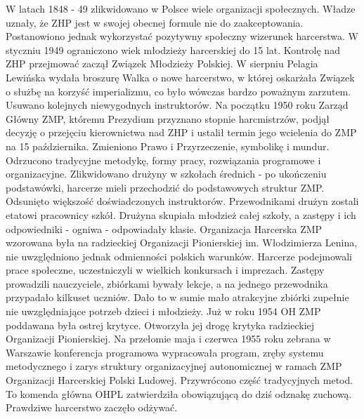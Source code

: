 W latach 1848 - 49 zlikwidowano w Polsce wiele organizacji społecznych. Władze uznały, że ZHP jest w swojej obecnej formule nie do zaakceptowania. Postanowiono jednak wykorzystać pozytywny społeczny wizerunek harcerstwa. W styczniu 1949 ograniczono wiek młodzieży harcerskiej do 15 lat. Kontrolę nad ZHP przejmować zaczął Związek Młodzieży Polskiej. W sierpniu Pelagia Lewińska wydała broszurę Walka o nowe harcerstwo, w której oskarżała Związek o służbę na korzyść imperializmu, co było wówczas bardzo poważnym zarzutem. Usuwano kolejnych niewygodnych instruktorów. Na początku 1950 roku Zarząd Główny ZMP, któremu Prezydium przyznano stopnie harcmistrzów, podjął decyzję o przejęciu kierownictwa nad ZHP i ustalił termin jego wcielenia do ZMP na 15 października. Zmieniono Prawo i Przyrzeczenie, symbolikę i mundur. Odrzucono tradycyjne metodykę, formy pracy, rozwiązania programowe i organizacyjne. Zlikwidowano drużyny w szkołach średnich - po ukończeniu podstawówki, harcerze mieli przechodzić do podstawowych struktur ZMP. Odsunięto większość doświadczonych instruktorów. Przewodnikami drużyn zostali etatowi pracownicy szkół. Drużyna skupiała młodzież całej szkoły, a zastępy i ich odpowiedniki - ogniwa - odpowiadały klasie. Organizacja Harcerska ZMP wzorowana była na radzieckiej Organizacji Pionierskiej im. Włodzimierza Lenina, nie uwzględniono jednak odmienności polskich warunków. Harcerze podejmowali prace społeczne, uczestniczyli w wielkich konkursach i imprezach. Zastępy prowadzili nauczyciele, zbiórkami bywały lekcje, a na jednego przewodnika przypadało kilkuset uczniów. Dało to w sumie mało atrakcyjne zbiórki zupełnie nie uwzględniające potrzeb dzieci i młodzieży. Już w roku 1954 OH ZMP poddawana była ostrej krytyce. Otworzyła jej drogę krytyka radzieckiej Organizacji Pionierskiej. Na przełomie maja i czerwca 1955 roku zebrana w Warszawie konferencja programowa wypracowała program, zręby systemu metodycznego i zarys struktury organizacyjnej autonomicznej w ramach ZMP Organizacji Harcerskiej Polski Ludowej. Przywrócono część tradycyjnych metod. To komenda główna OHPL zatwierdziła obowiązującą do dziś odznakę zuchową. Prawdziwe harcerstwo zaczęło odżywać.


